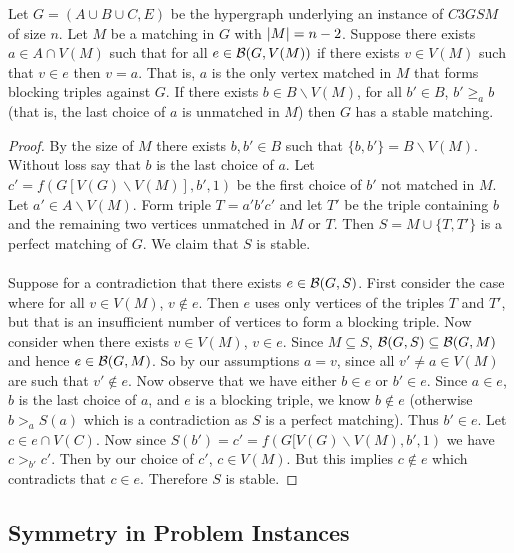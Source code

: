 \begin{lemma}\label{lemma:fixing}
Let $G = (A\cup B \cup C, E)$ be the hypergraph underlying an instance of $C3GSM$ of size $n$. Let $M$ be a matching in $G$ with $\left|M\right| = n-2$. Suppose there exists $a \in A \cap V(M)$ such that for all $e \in \mathcal{B}(G, V(M))$ if there exists $v \in V(M)$ such that $v \in e$ then $v = a$. That is, $a$ is the only vertex matched in $M$ that forms blocking triples against $G$. If there exists $b \in B\backslash V(M)$, for all $b' \in B$, $b' \geq_a b$ (that is, the last choice of $a$ is unmatched in $M$) then $G$ has a stable matching.
\end{lemma}
\begin{proof}
By the size of $M$ there exists $b,b' \in B$ such that $\{b,b'\} = B \backslash V(M)$. Without loss say that $b$ is the last choice of $a$. Let $c' = f(G[V(G)\backslash V(M)],b', 1)$ be the first choice of $b'$ not matched in $M$. Let $a' \in A\backslash V(M)$. Form triple $T = a'b'c'$ and let $T'$ be the triple containing $b$ and the remaining two vertices unmatched in $M$ or $T$. Then $S = M \cup \{T, T'\}$ is a perfect matching of $G$. We claim that $S$ is stable.
\paragraph{}
Suppose for a contradiction that there exists $e \in \mathcal{B}(G,S)$. First consider the case where for all $v \in V(M)$, $v \not\in e$. Then $e$ uses only vertices of the triples $T$ and $T'$, but that is an insufficient number of vertices to form a blocking triple. Now consider when there exists $v \in V(M)$, $v \in e$. Since $M \subseteq S$, $\mathcal{B}(G,S) \subseteq \mathcal{B}(G,M)$ and hence $e \in \mathcal{B}(G,M)$. So by our assumptions $a=v$, since all $v' \neq a \in V(M)$ are such that $v' \not\in e$. Now observe that we have either $b \in e$ or $b' \in e$. Since $a \in e$, $b$ is the last choice of $a$, and $e$ is a blocking triple, we know $b \not\in e$ (otherwise $b >_a S(a)$ which is a contradiction as $S$ is a perfect matching). Thus $b' \in e$. Let $c \in e \cap V(C)$. Now since $S(b') = c' = f(G[V(G)\backslash V(M),b',1)$ we have $c >_{b'} c'$. Then by our choice of $c'$, $c \in V(M)$. But this implies $c \not \in e$ which contradicts that $c \in e$. Therefore $S$ is stable.
\end{proof}
\subsection{Symmetry in Problem Instances}\label{subsec:symmetry}
